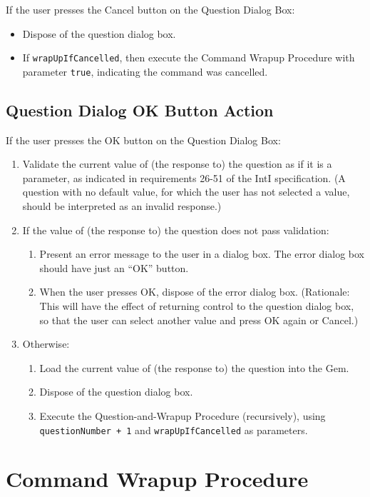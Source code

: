 \documentclass[11pt]{article}
\begin{document}
If the user presses the Cancel button on the Question Dialog Box:
\begin{itemize}
\item Dispose of the question dialog box.
\item If {\tt wrapUpIfCancelled}, then execute the Command Wrapup
  Procedure with parameter {\tt true}, indicating the command was
  cancelled.
\end{itemize}

\subsection{Question Dialog OK Button Action}

If the user presses the OK button on the Question Dialog Box:
\begin{enumerate}
\item Validate the current value of (the response to)
  the question as if it is a
  parameter, as indicated in requirements 26-51 of the IntI
  specification.  (A question with no default value, for which
  the user has not selected a value, should be interpreted as
  an invalid response.)
\item If the value of (the response to) the question does not pass
  validation:
  \begin{enumerate}
  \item Present an error message to the user in a dialog box.
    The error dialog box should have just an ``OK'' button.
  \item When the user presses OK, dispose of the error dialog box.
    (Rationale:  This will have the effect of returning control
    to the question dialog box, so that the user can select another
    value and press OK again or Cancel.)
  \end{enumerate}
\item Otherwise:
  \begin{enumerate}
  \item Load the current value of (the response to) the question
    into the Gem.
  \item Dispose of the question dialog box.
  \item Execute the Question-and-Wrapup Procedure
    (recursively), using {\tt questionNumber + 1} and {\tt wrapUpIfCancelled}
    as parameters.
  \end{enumerate}
\end{enumerate}

\section{Command Wrapup Procedure}
\end{document}
